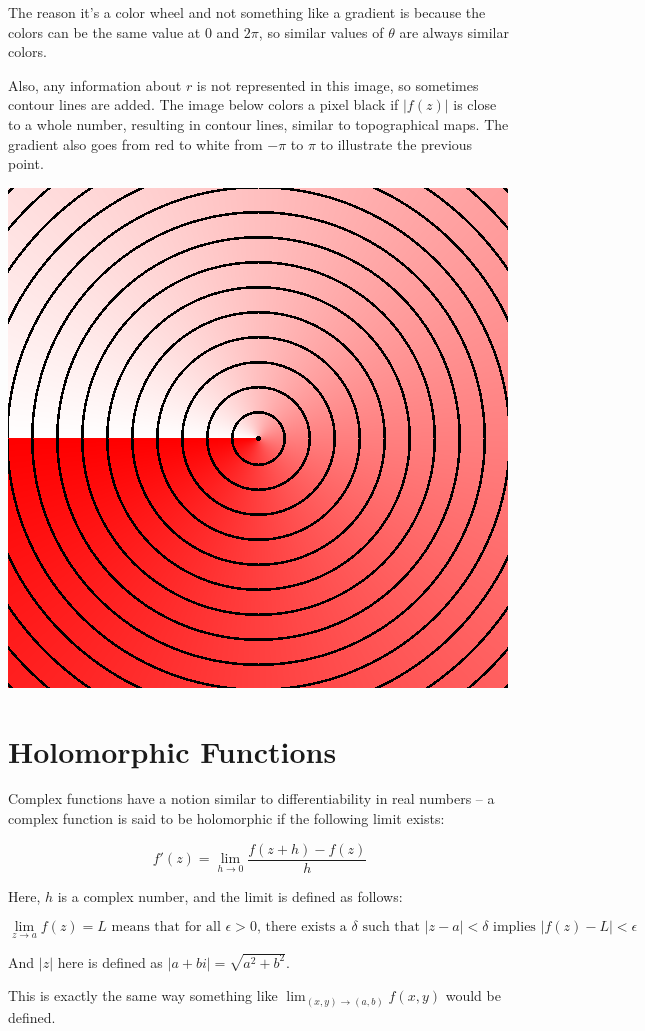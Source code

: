 \documentclass[xhtml, mathjax]{article}
\begin{document}
  The reason it's a color wheel and not something like a gradient is because the
  colors can be the same value at $0$ and $2\pi$, so similar values of $\theta$
  are always similar colors.

  Also, any information about $r$ is not represented in this image, so sometimes
  contour lines are added. The image below colors a pixel black if $|f(z)|$ is
  close to a whole number, resulting in contour lines, similar to topographical
  maps. The gradient also goes from red to white from $-\pi$ to $\pi$ to illustrate
  the previous point.

  \begin{center}
    \includegraphics{example2.gif}
  \end{center}


  \section{Holomorphic Functions}

  Complex functions have a notion similar to differentiability in real numbers
  -- a complex function is said to be holomorphic if the following limit exists:

  \[f'(z) = \lim_{h \to 0} \frac{f(z+h) - f(z)}{h}\]

  Here, $h$ is a complex number, and the limit is defined as follows:

  \[\lim_{z \to a}f(z) = L \text{ means that for all } \epsilon > 0 \text{,
  there exists a } \delta \text{ such that } |z - a| < \delta \text{ implies }
  |f(z) - L| < \epsilon\]

  And $|z|$ here is defined as $|a+bi| = \sqrt{a^2+b^2}$.

  This is exactly the same way something like $\lim_{(x,y) \to (a,b)} f(x,y)$
  would be defined.
\end{document}
